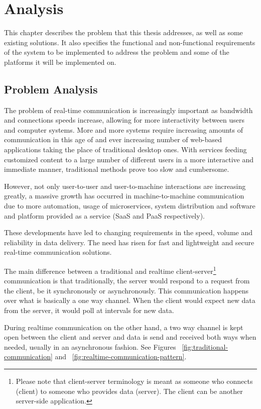 \chapter{Analysis}\label{chap:analysis}

This chapter describes the problem that this thesis addresses, as well as some existing solutions. It also specifies the functional and non-functional requirements of the system to be implemented to address the problem and some of the platforms it will be implemented on.

\section{Problem Analysis}
The problem of real-time communication is increasingly important as bandwidth and connections speeds increase, allowing for more interactivity between users and computer systems. More and more systems require increasing amounts of communication in this age of and ever increasing number of web-based applications taking the place of traditional desktop ones. With services feeding customized content to a large number of different users in a more interactive and immediate manner, traditional methods prove too slow and cumbersome.

However, not only user-to-user and user-to-machine interactions are increasing greatly, a massive growth has occurred in machine-to-machine communication due to more automation, usage of microservices, system distribution and software and platform provided as a service (SaaS and PaaS respectively).

These developments have led to changing requirements in the speed, volume and reliability in data delivery. The need has risen for fast and lightweight and secure real-time communication solutions.

The main difference between a traditional and realtime client-server\footnote{Please note that client-server terminology is meant as someone who connects (client) to someone who provides data (server). The client can be another server-side application.} communication is that traditionally, the server would respond to a request from the client, be it synchronously or asynchronously. This communication happens over what is basically a one way channel. When the client would expect new data from the server, it would poll at intervals for new data. 

During realtime communication on the other hand, a two way channel is kept open between the client and server and data is send and received both ways when needed, usually in an asynchronous fashion. See Figures ~\ref{fig:traditional-communication} and ~\ref{fig:realtime-communication-pattern}.

